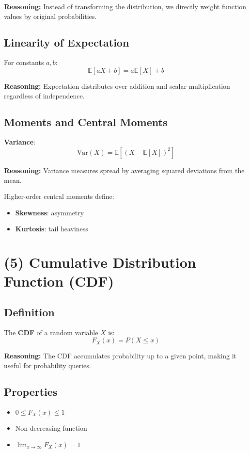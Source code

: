\documentclass[11pt]{article}
\begin{document}
\textbf{Reasoning:}  
Instead of transforming the distribution, we directly weight function values by original probabilities.

\subsection*{Linearity of Expectation}
For constants $a, b$:
\[
\mathbb{E}[aX + b] = a\mathbb{E}[X] + b
\]

\textbf{Reasoning:}  
Expectation distributes over addition and scalar multiplication regardless of independence.

\subsection*{Moments and Central Moments}

\textbf{Variance}:
\[
\text{Var}(X) = \mathbb{E}[(X - \mathbb{E}[X])^2]
\]

\textbf{Reasoning:}  
Variance measures spread by averaging squared deviations from the mean.

Higher-order central moments define:
\begin{itemize}
    \item \textbf{Skewness}: asymmetry
    \item \textbf{Kurtosis}: tail heaviness
\end{itemize}

\section*{(5) Cumulative Distribution Function (CDF)}

\subsection*{Definition}
The \textbf{CDF} of a random variable $X$ is:
\[
F_X(x) = P(X \le x)
\]

\textbf{Reasoning:}  
The CDF accumulates probability up to a given point, making it useful for probability queries.

\subsection*{Properties}
\begin{itemize}
    \item $0 \le F_X(x) \le 1$
    \item Non-decreasing function
    \item $\lim_{x \to \infty} F_X(x) = 1$
\end{itemize}
\end{document}
